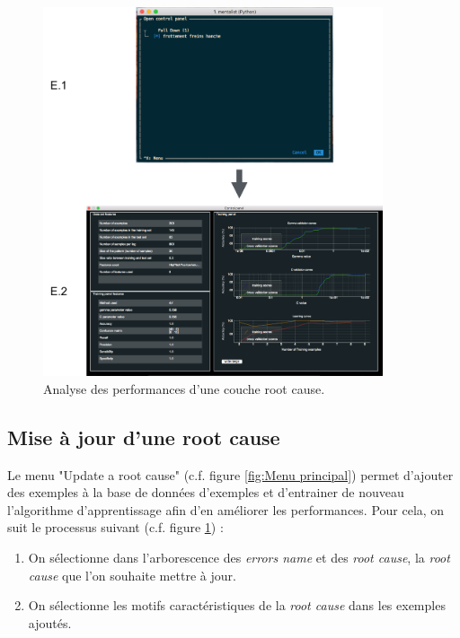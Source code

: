 \begin{figure}[H]
	\centering\includegraphics[width=10cm]{images/perf_menu.png}
	\caption[Analyse des performances d'une couche root cause]{Analyse des performances d'une couche root cause.}
	\label{fig: Analyse des performances d'une couche root cause}
\end{figure} 


\subsection{Mise à jour d'une root cause}
\label{Industrialisation du produit: Utilisation suggérée des outils: Mise à jour d'une root cause}
Le menu "Update a root cause"  (c.f. figure \ref{fig:Menu principal}) permet d'ajouter des exemples à la base de données d'exemples et d'entrainer de nouveau l'algorithme d'apprentissage afin d'en améliorer les performances. Pour cela, on suit le processus suivant (c.f. figure \ref{fig: Analyse des performances d'une couche root cause}) : 
\begin{enumerate}
	\item On sélectionne dans l'arborescence des \emph{errors name} et des \emph{root cause}, la \emph{root cause} que l'on souhaite mettre à jour.
	\item On sélectionne les motifs caractéristiques de la \emph{root cause} dans les exemples ajoutés.
\end{enumerate}

